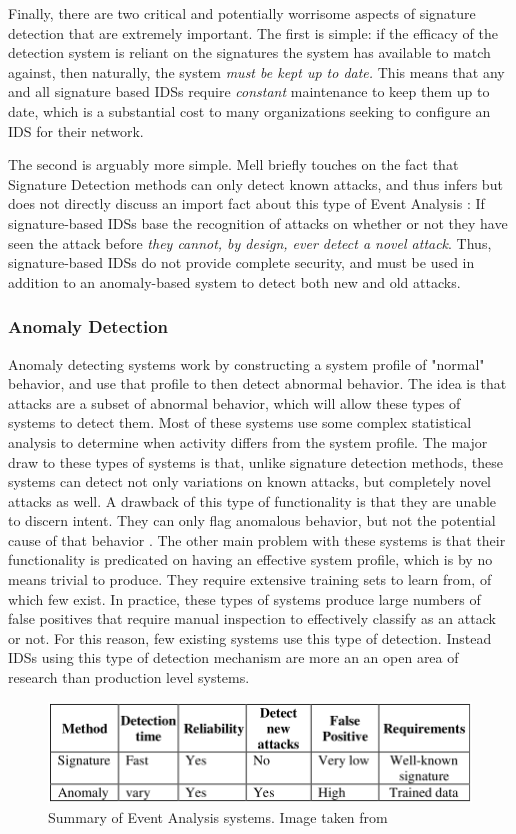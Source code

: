 \documentclass{acm_proc_article-sp}
\begin{document}
	    	Finally, there are two critical and potentially worrisome aspects of signature detection that are extremely important. The first is simple: if the efficacy of the detection system is reliant on the signatures the system has available to match against, then naturally, the system \emph{must be kept up to date.} This means that any and all signature based IDSs require \emph{constant} maintenance to keep them up to date, which is a substantial cost to many organizations seeking to configure an IDS for their network.
	    	
	    	The second is arguably more simple. Mell briefly touches on the fact that Signature Detection methods can only detect known attacks, and thus infers but does not directly discuss an import fact about this type of Event Analysis \cite{Taylor2006}: If signature-based IDSs base the recognition of attacks on whether or not they have seen the attack before \emph{they cannot, by design, ever detect a novel attack}. Thus, signature-based IDSs do not provide complete security, and must be used in addition to an anomaly-based system to detect both new and old attacks.
    	\subsubsection{Anomaly Detection}
    		Anomaly detecting systems work by constructing a system profile of "normal" behavior, and use that profile to then detect abnormal behavior. The idea is that attacks are a subset of abnormal behavior, which will allow these types of systems to detect them. Most of these systems use some complex statistical analysis to determine when activity differs from the system profile. The major draw to these types of systems is that, unlike signature detection methods, these systems can detect not only variations on known attacks, but completely novel attacks as well. A drawback of this type of functionality is that they are unable to discern intent. They can only flag anomalous behavior, but not the potential cause of that behavior \cite{Mahoney2001}. The other main problem with these systems is that their functionality is predicated on having an effective system profile, which is by no means trivial to produce. They require extensive training sets to learn from, of which few exist. In practice, these types of systems produce large numbers of false positives that require manual inspection to effectively classify as an attack or not. For this reason, few existing systems use this type of detection. Instead IDSs using this type of detection mechanism are more an an open area of research than production level systems. 
    	\begin{figure}[h!]
			\centering
			\includegraphics[width=.5\textwidth]{signatreVSanomaly.png}
			\caption{Summary of Event Analysis systems. Image taken from \cite{Alenezi2012}}
			\label{comparison}
	\end{figure}
\end{document}
